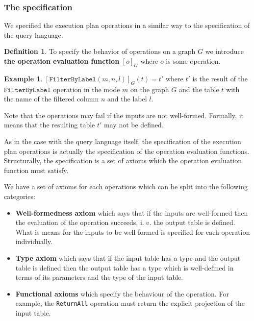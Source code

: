 \documentclass[14pt]{constructor-thesis}
\theoremstyle{definition}
\newtheorem{definition}{Definition}
\newtheorem{example}{Example}
\begin{document}
\subsubsection{The specification}

We specified the execution plan operations in a similar way to the specification of the query language.

\begin{definition}
  To specify the behavior of operations on a graph $G$ we introduce \textbf{the operation evaluation function} $[o]_G$ where $o$ is some operation. 
\end{definition}

\begin{example}
  $ [\texttt{FilterByLabel}(m, n, l)]_G (t) = t' $ where $t'$ is the result of the $\texttt{FilterByLabel}$ operation in the mode $m$ on the graph $G$ and the table $t$ with the name of the filtered column $n$ and the label $l$.
\end{example}

Note that the operations may fail if the inputs are not well-formed. Formally, it means that the resulting table $t'$ may not be defined.

As in the case with the query language itself, the specification of the execution plan operations is actually the specification of the operation evaluation functions. Structurally, the specification is a set of axioms which the operation evaluation function must satisfy.

We have a set of axioms for each operations which can be split into the following categories:
\begin{itemize}
  \item \textbf{Well-formedness axiom} which says that if the inputs are well-formed then the evaluation of the operation succeeds, i. e. the output table is defined. What is means for the inputs to be well-formed is specified for each operation individually.
  \item \textbf{Type axiom} which says that if the input table has a type and the output table is defined then the output table has a type which is well-defined in terms of its parameters and the type of the input table.
  \item \textbf{Functional axioms} which specify the behaviour of the operation. For example, the \texttt{ReturnAll} operation must return the explicit projection of the input table.

\end{itemize}
\end{document}

